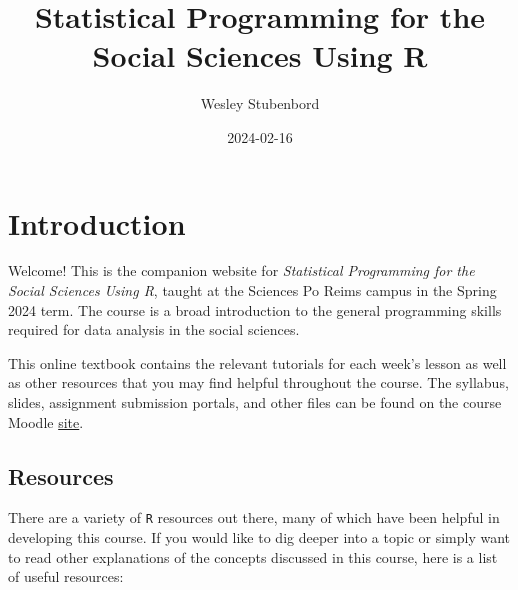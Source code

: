 \documentclass[
]{book}
\title{Statistical Programming for the Social Sciences Using R}
\author{Wesley Stubenbord}
\date{2024-02-16}
\begin{document}
\maketitle

{
\setcounter{tocdepth}{1}
\tableofcontents
}
\hypertarget{introduction}{%
\chapter*{Introduction}\label{introduction}}

Welcome! This is the companion website for \emph{Statistical Programming for the Social Sciences Using R}, taught at the Sciences Po Reims campus in the Spring 2024 term. The course is a broad introduction to the general programming skills required for data analysis in the social sciences.

This online textbook contains the relevant tutorials for each week's lesson as well as other resources that you may find helpful throughout the course. The syllabus, slides, assignment submission portals, and other files can be found on the course Moodle \href{https://moodle.sciences-po.fr/course/view.php?id=40782}{site}.

\hypertarget{resources}{%
\section*{Resources}\label{resources}}

There are a variety of \texttt{R} resources out there, many of which have been helpful in developing this course. If you would like to dig deeper into a topic or simply want to read other explanations of the concepts discussed in this course, here is a list of useful resources:
\end{document}
